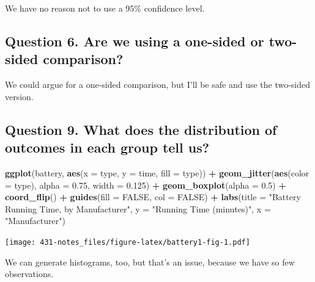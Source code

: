 \documentclass[
]{book}
\newenvironment{Shaded}{\begin{snugshade}}{\end{snugshade}}
\newcommand{\DataTypeTok}[1]{\textcolor[rgb]{0.13,0.29,0.53}{#1}}
\newcommand{\FloatTok}[1]{\textcolor[rgb]{0.00,0.00,0.81}{#1}}
\newcommand{\KeywordTok}[1]{\textcolor[rgb]{0.13,0.29,0.53}{\textbf{#1}}}
\newcommand{\NormalTok}[1]{#1}
\newcommand{\OperatorTok}[1]{\textcolor[rgb]{0.81,0.36,0.00}{\textbf{#1}}}
\newcommand{\OtherTok}[1]{\textcolor[rgb]{0.56,0.35,0.01}{#1}}
\newcommand{\StringTok}[1]{\textcolor[rgb]{0.31,0.60,0.02}{#1}}
\begin{document}
We have no reason not to use a 95\% confidence level.

\hypertarget{question-6.-are-we-using-a-one-sided-or-two-sided-comparison}{%
\subsection{Question 6. Are we using a one-sided or two-sided comparison?}\label{question-6.-are-we-using-a-one-sided-or-two-sided-comparison}}

We could argue for a one-sided comparison, but I'll be safe and use the two-sided version.

\hypertarget{question-9.-what-does-the-distribution-of-outcomes-in-each-group-tell-us}{%
\subsection{Question 9. What does the distribution of outcomes in each group tell us?}\label{question-9.-what-does-the-distribution-of-outcomes-in-each-group-tell-us}}

\begin{Shaded}
\begin{Highlighting}[]
\KeywordTok{ggplot}\NormalTok{(battery, }\KeywordTok{aes}\NormalTok{(}\DataTypeTok{x =}\NormalTok{ type, }\DataTypeTok{y =}\NormalTok{ time, }\DataTypeTok{fill =}\NormalTok{ type)) }\OperatorTok{+}
\StringTok{  }\KeywordTok{geom_jitter}\NormalTok{(}\KeywordTok{aes}\NormalTok{(}\DataTypeTok{color =}\NormalTok{ type), }\DataTypeTok{alpha =} \FloatTok{0.75}\NormalTok{, }\DataTypeTok{width =} \FloatTok{0.125}\NormalTok{) }\OperatorTok{+}
\StringTok{  }\KeywordTok{geom_boxplot}\NormalTok{(}\DataTypeTok{alpha =} \FloatTok{0.5}\NormalTok{) }\OperatorTok{+}
\StringTok{  }\KeywordTok{coord_flip}\NormalTok{() }\OperatorTok{+}
\StringTok{  }\KeywordTok{guides}\NormalTok{(}\DataTypeTok{fill =} \OtherTok{FALSE}\NormalTok{, }\DataTypeTok{col =} \OtherTok{FALSE}\NormalTok{) }\OperatorTok{+}
\StringTok{  }\KeywordTok{labs}\NormalTok{(}\DataTypeTok{title =} \StringTok{"Battery Running Time, by Manufacturer"}\NormalTok{,}
       \DataTypeTok{y =} \StringTok{"Running Time (minutes)"}\NormalTok{, }\DataTypeTok{x =} \StringTok{"Manufacturer"}\NormalTok{)}
\end{Highlighting}
\end{Shaded}

\texttt{[image: 431-notes\_files/figure-latex/battery1-fig-1.pdf]}

We can generate histograms, too, but that's an issue, because we have so few observations.
\end{document}
